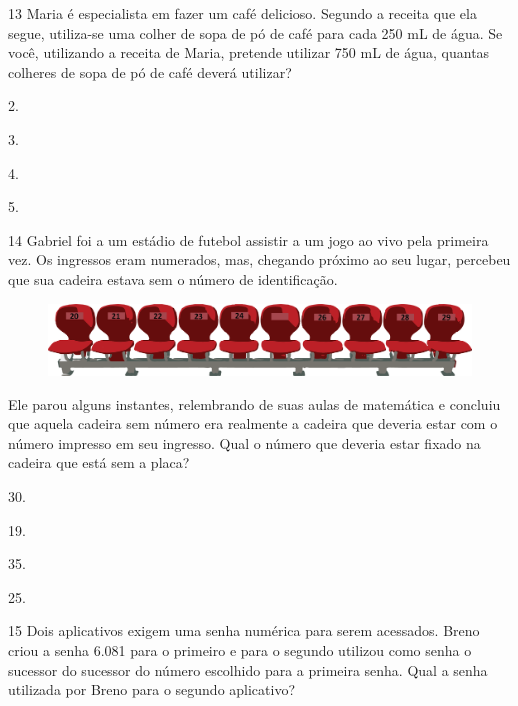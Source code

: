 \pagebreak

\num{13} Maria é especialista em fazer um café delicioso. Segundo a receita que ela segue, utiliza-se uma colher de sopa de pó de café para cada 250 mL de água. Se você, utilizando a receita de Maria, pretende utilizar 750 mL de água, quantas colheres de sopa de pó de café deverá utilizar?

\begin{escolha}
\item
  2.
\item
  3.
\item
  4.
\item
  5.
\end{escolha}

\num{14} Gabriel foi a um estádio de futebol assistir a um jogo ao vivo pela primeira vez. Os ingressos eram numerados, mas, chegando próximo ao seu
lugar, percebeu que sua cadeira estava sem o número de identificação.

\begin{figure}[htpb!]
\centering
\includegraphics[width=\textwidth]{./media/image107.png}
\end{figure}

Ele parou alguns instantes, relembrando de suas aulas de matemática e concluiu que aquela cadeira sem número era realmente a cadeira que deveria estar com o número impresso em seu ingresso. Qual o número que
deveria estar fixado na cadeira que está sem a placa?

\begin{escolha}
\item
  30.
\item
  19.
\item
  35.
\item
  25.
\end{escolha}

\pagebreak
\num{15} Dois aplicativos exigem uma senha numérica para serem acessados. Breno criou a senha 6.081 para o primeiro e para o segundo utilizou como senha o sucessor do sucessor do número escolhido para a primeira senha. Qual a senha utilizada por Breno para o segundo aplicativo?

